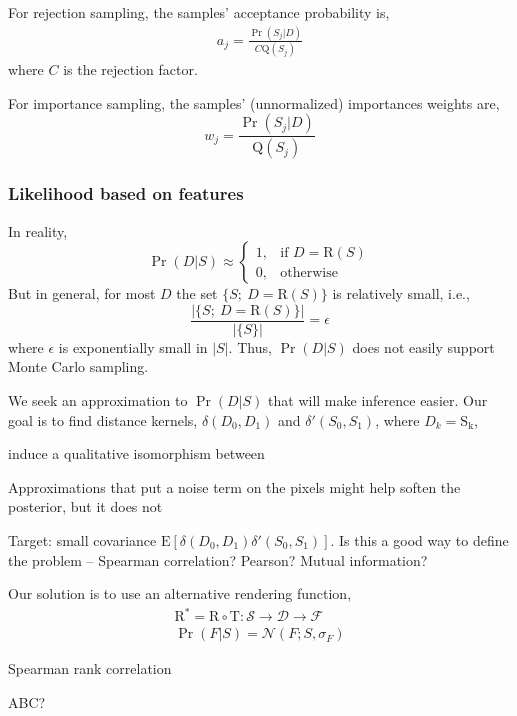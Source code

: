 \documentclass[]{report}
\begin{document}
For rejection sampling, the samples' acceptance probability is,
\begin{align*}
  a_j = \frac{\Pr(S_j | D)}{C \mathrm{Q}(S_j)}
\end{align*}
where $C$ is the rejection factor.

For importance sampling, the samples' (unnormalized) importances
weights are,
\[
w_j = \frac{\Pr(S_j | D)}{\mathrm{Q}(S_j)}
\]

\subsubsection*{Likelihood based on features}
In reality, 
\[
\Pr(D | S) \approx 
\begin{cases}
  1 , & \text{if } D = \mathrm{R}(S) \\
  0 , & \text{otherwise}
\end{cases}
\]
But in general, for most $D$ the set $\{S;\ D = \mathrm{R}(S)\}$ is
relatively small, i.e.,
\[
\frac{|\{S;\ D = \mathrm{R}(S)\}|}{|\{S\}|} = \epsilon
\]
where $\epsilon$ is exponentially small in $|S|$. Thus, $\Pr(D | S)$
does not easily support Monte Carlo sampling.

We seek an approximation to $\Pr(D|S)$ that will make inference
easier.  Our goal is to find distance kernels, $\delta(D_0, D_1)$ and
$\delta'(S_0, S_1)$, where $D_k = \mathrm{S_k}$,


induce a qualitative isomorphism between

Approximations that put a noise term on the pixels might help
soften the posterior, but it does not 

Target: small covariance
$\mathrm{E}[\delta(D_0, D_1) \delta'(S_0, S_1)]$.  Is this a good way to define
the problem -- Spearman correlation? Pearson?  Mutual information?

Our solution is to use an alternative rendering function,
\begin{align*}
  \mathrm{R}^* = \mathrm{R} \circ \mathrm{T} : \mathcal{S} \rightarrow \mathcal{D} \rightarrow \mathcal{F}\\
  \Pr(F | S) = \mathcal{N}(F;S, \sigma_F)
\end{align*}

Spearman rank correlation

ABC?
\end{document}
